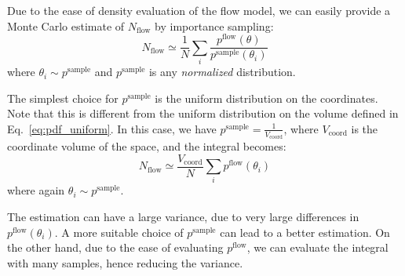 \documentclass[twocolumn,showpacs,preprintnumbers,nofootinbib,prd,
superscriptaddress,10pt]{revtex4-2}
\begin{document}
Due to the ease of density evaluation of the flow model, we can easily provide a Monte Carlo estimate of $N_\text{flow}$ by importance sampling:
\begin{equation}
	N_\text{flow} \simeq \frac{1}{N} \sum_i \frac{p^\text{flow}(\theta)}{p^\text{sample}(\theta_i)}
\end{equation}
where ${\theta_i \sim p^\text{sample}}$ and $p^\text{sample}$ is any {\it normalized} distribution.

The simplest choice for $p^\text{sample}$ is the uniform distribution on the coordinates. Note that this is different from the uniform distribution on the volume defined in Eq.~\eqref{eq:pdf_uniform}. In this case, we have $p^\text{sample} = \frac{1}{V_\text{coord}}$, where $V_\text{coord}$ is the coordinate volume of the space, and the integral becomes:
\begin{equation}
	N_\text{flow} \simeq \frac{V_\text{coord}}{N} \sum_i p^\text{flow}(\theta_i)
\end{equation}
where again $\theta_i \sim p^\text{sample} $.

The estimation can have a large variance, due to very large differences in $p^\text{flow}(\theta_i)$. A more suitable choice of $p^\text{sample}$ can lead to a better estimation. On the other hand, due to the ease of evaluating $p^\text{flow}$, we can evaluate the integral with many samples, hence reducing the variance.
\end{document}
